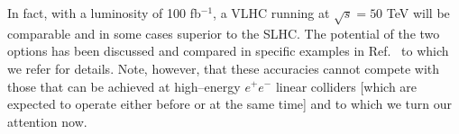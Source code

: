 In fact, with a luminosity of 100 fb$^{-1}$,
a VLHC running at $\sqrt{s}=50$ TeV will be comparable and in some cases
superior to the SLHC.  The potential of the two options has been
discussed and compared in specific examples in Ref.~\cite{SLHC+VLHC} to
which we refer for details. Note, however, that these accuracies cannot
compete with those that can be achieved at high--energy $e^+ e^-$ linear
colliders [which are expected to operate either before or at the same time]
and to which we turn our attention now. 

\newpage

 


